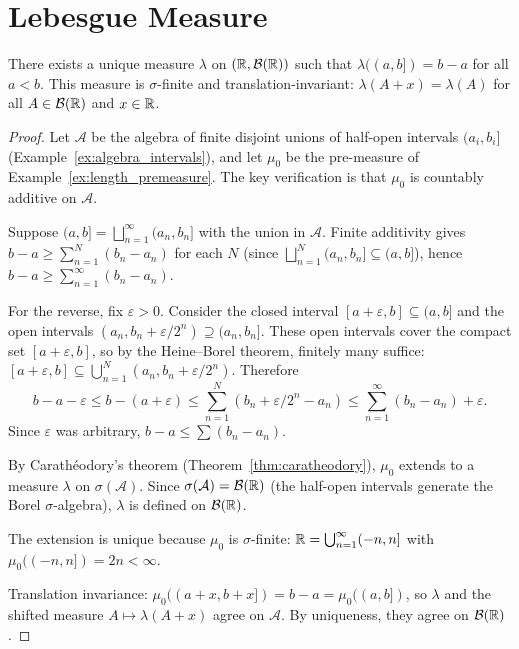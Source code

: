 \documentclass[11pt,a4paper]{article}
\begin{document}

\section{Lebesgue Measure}
\label{sec:lebesgue}

\begin{theorem}
\label{thm:lebesgue}
There exists a unique measure $\lambda$ on $(\mathbb{R}, \mathcal{B}(\mathbb{R}))$ such
that $\lambda((a, b]) = b - a$ for all $a < b$. This measure is
$\sigma$-finite and translation-invariant:
$\lambda(A + x) = \lambda(A)$ for all $A \in \mathcal{B}(\mathbb{R})$ and
$x \in \mathbb{R}$.
\end{theorem}

\begin{proof}
Let $\mathcal{A}$ be the algebra of finite disjoint unions of
half-open intervals $(a_i, b_i]$
(Example~\ref{ex:algebra_intervals}), and let $\mu_0$ be the
pre-measure of Example~\ref{ex:length_premeasure}. The key
verification is that $\mu_0$ is countably additive on $\mathcal{A}$.

Suppose $(a, b] = \bigsqcup_{n=1}^\infty (a_n, b_n]$ with the union
in $\mathcal{A}$. Finite additivity gives
$b - a \geq \sum_{n=1}^N (b_n - a_n)$ for each $N$ (since
$\bigsqcup_{n=1}^N (a_n, b_n] \subseteq (a, b]$), hence
$b - a \geq \sum_{n=1}^\infty (b_n - a_n)$.

For the reverse, fix $\varepsilon > 0$. Consider the closed interval
$[a + \varepsilon, b] \subseteq (a, b]$ and the open intervals
$(a_n, b_n + \varepsilon/2^n) \supseteq (a_n, b_n]$. These open
intervals cover the compact set $[a + \varepsilon, b]$, so by the
Heine--Borel theorem, finitely many suffice:
$[a + \varepsilon, b] \subseteq \bigcup_{n=1}^N
(a_n, b_n + \varepsilon/2^n)$. Therefore
\begin{equation}
  b - a - \varepsilon \leq b - (a + \varepsilon)
    \leq \sum_{n=1}^N (b_n + \varepsilon/2^n - a_n)
    \leq \sum_{n=1}^\infty (b_n - a_n) + \varepsilon.
\end{equation}
Since $\varepsilon$ was arbitrary,
$b - a \leq \sum (b_n - a_n)$.

By Carath\'{e}odory's theorem (Theorem~\ref{thm:caratheodory}),
$\mu_0$ extends to a measure $\lambda$ on $\sigma(\mathcal{A})$. Since
$\sigma(\mathcal{A}) = \mathcal{B}(\mathbb{R})$ (the half-open intervals generate
the Borel $\sigma$-algebra), $\lambda$ is defined on $\mathcal{B}(\mathbb{R})$.

The extension is unique because $\mu_0$ is $\sigma$-finite:
$\mathbb{R} = \bigcup_{n=1}^\infty (-n, n]$ with
$\mu_0((-n, n]) = 2n < \infty$.

Translation invariance: $\mu_0((a + x, b + x]) = b - a =
\mu_0((a, b])$, so $\lambda$ and the shifted measure
$A \mapsto \lambda(A + x)$ agree on $\mathcal{A}$. By uniqueness,
they agree on $\mathcal{B}(\mathbb{R})$.
\end{proof}
\end{document}

